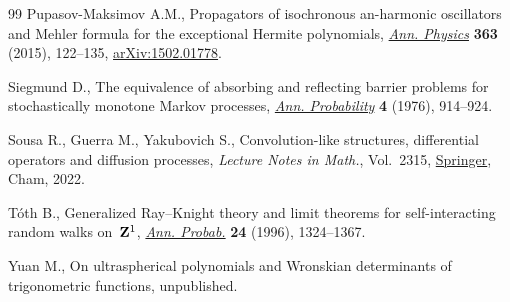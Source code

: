 \begin{thebibliography}{99}
Pupasov-Maksimov A.M., Propagators of isochronous an-harmonic oscillators and
 {M}ehler formula for the exceptional {H}ermite polynomials,
 \href{https://doi.org/10.1016/j.aop.2015.09.021}{\textit{Ann. Physics}}
 \textbf{363} (2015), 122--135,
 \href{http://arxiv.org/abs/1502.01778}{arXiv:1502.01778}.

Siegmund D., The equivalence of absorbing and reflecting barrier problems for
 stochastically monotone {M}arkov processes,
 \href{https://doi.org/10.1214/aop/1176995936}{\textit{Ann. Probability}}
 \textbf{4} (1976), 914--924.

Sousa R., Guerra M., Yakubovich S., Convolution-like structures, differential
 operators and diffusion processes, \textit{Lecture Notes in Math.}, Vol.~2315, \href{https://doi.org/10.1007/978-3-031-05296-5}{Springer}, Cham, 2022.

T\'oth B., Generalized {R}ay--{K}night theory and limit theorems for
 self-interacting random walks on~{${\bf Z}^1$},
 \href{https://doi.org/10.1214/aop/1065725184}{\textit{Ann. Probab.}}
 \textbf{24} (1996), 1324--1367.

Yuan M., On ultraspherical polynomials and {W}ronskian determinants of
 trigonometric functions, {u}npublished.

\end{thebibliography}
